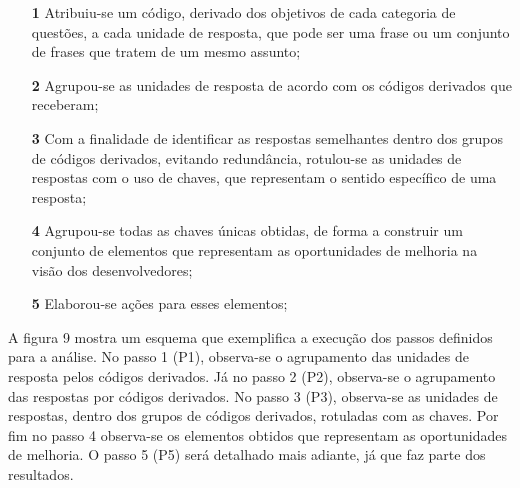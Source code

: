 \begin{enumerate}
	\item[\textbf{\llap{P}1}] Atribuiu-se um código, derivado dos objetivos de cada categoria de questões, a cada unidade de resposta, que pode ser uma frase ou um conjunto de frases que tratem de um mesmo assunto;
	\item[\textbf{\llap{P}2}] Agrupou-se as unidades de resposta de acordo com os códigos derivados que receberam;
	\item[\textbf{\llap{P}3}] Com a finalidade de identificar as respostas semelhantes dentro dos grupos de códigos derivados, evitando redundância, rotulou-se as unidades de respostas com o uso de chaves, que representam o sentido específico de uma resposta;
	\item[\textbf{\llap{P}4}] Agrupou-se todas as chaves únicas obtidas, de forma a construir um conjunto de elementos que representam as oportunidades de melhoria na visão dos desenvolvedores;
	\item[\textbf{\llap{P}5}] Elaborou-se ações para esses elementos;
\end{enumerate}

A figura 9 mostra um esquema que exemplifica a execução dos passos definidos para a análise. No passo 1 (P1), observa-se o agrupamento das unidades de resposta pelos códigos derivados. Já no passo 2 (P2), observa-se o agrupamento das respostas por códigos derivados. No passo 3 (P3), observa-se as unidades de respostas, dentro dos grupos de códigos derivados, rotuladas com as chaves. Por fim no passo 4 observa-se os elementos obtidos que representam as oportunidades de melhoria. O passo 5 (P5) será detalhado mais adiante, já que faz parte dos resultados.

